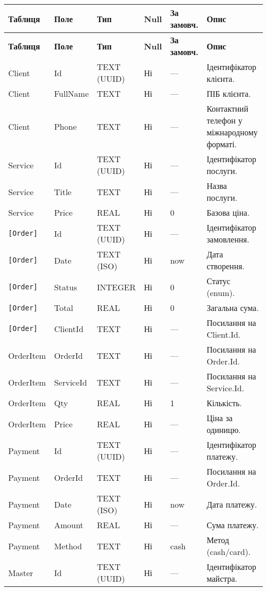\documentclass[14pt,a4paper]{extarticle}
\begin{document}
\begin{longtable}{@{}p{2.8cm} p{3.2cm} p{3.2cm} p{2.0cm} p{3.2cm} p{8.2cm}@{}}
\toprule
\textbf{Таблиця} & \textbf{Поле} & \textbf{Тип} & \textbf{Null} & \textbf{За замовч.} & \textbf{Опис}\\
\midrule
\endfirsthead
\toprule
\textbf{Таблиця} & \textbf{Поле} & \textbf{Тип} & \textbf{Null} & \textbf{За замовч.} & \textbf{Опис}\\
\midrule
\endhead
Client & Id & TEXT (UUID) & Ні & — & Ідентифікатор клієнта. \\
Client & FullName & TEXT & Ні & — & ПІБ клієнта. \\
Client & Phone & TEXT & Ні & — & Контактний телефон у міжнародному форматі. \\
\addlinespace
Service & Id & TEXT (UUID) & Ні & — & Ідентифікатор послуги. \\
Service & Title & TEXT & Ні & — & Назва послуги. \\
Service & Price & REAL & Ні & 0 & Базова ціна. \\
\addlinespace
\texttt{[Order]} & Id & TEXT (UUID) & Ні & — & Ідентифікатор замовлення. \\
\texttt{[Order]} & Date & TEXT (ISO) & Ні & now & Дата створення. \\
\texttt{[Order]} & Status & INTEGER & Ні & 0 & Статус (enum). \\
\texttt{[Order]} & Total & REAL & Ні & 0 & Загальна сума. \\
\texttt{[Order]} & ClientId & TEXT & Ні & — & Посилання на Client.Id. \\
\addlinespace
OrderItem & OrderId & TEXT & Ні & — & Посилання на Order.Id. \\
OrderItem & ServiceId & TEXT & Ні & — & Посилання на Service.Id. \\
OrderItem & Qty & REAL & Ні & 1 & Кількість. \\
OrderItem & Price & REAL & Ні & — & Ціна за одиницю. \\
\addlinespace
Payment & Id & TEXT (UUID) & Ні & — & Ідентифікатор платежу. \\
Payment & OrderId & TEXT & Ні & — & Посилання на Order.Id. \\
Payment & Date & TEXT (ISO) & Ні & now & Дата платежу. \\
Payment & Amount & REAL & Ні & — & Сума платежу. \\
Payment & Method & TEXT & Ні & cash & Метод (cash/card). \\
\addlinespace
Master & Id & TEXT (UUID) & Ні & — & Ідентифікатор майстра. \\

\end{longtable}
\end{document}
